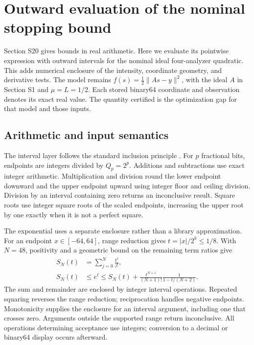 \section{Outward evaluation of the nominal stopping bound}
\label{sec:svalidated}
Section S20 gives bounds in real arithmetic. Here we evaluate its pointwise expression with outward intervals for the nominal ideal four-analyzer quadratic. This adds numerical enclosure of the intensity, coordinate geometry, and derivative tests. The model remains $f(s)=\tfrac12\|As-y\|^2$, with the ideal $A$ in Section S1 and $\mu=L=1/2$. Each stored binary64 coordinate and observation denotes its exact real value. The quantity certified is the optimization gap for that model and those inputs.

\subsection{Arithmetic and input semantics}
The interval layer follows the standard inclusion principle \cite[Secs.~5.3--5.5]{rump}. For $p$ fractional bits, endpoints are integers divided by $Q_p=2^p$. Additions and subtractions use exact integer arithmetic. Multiplication and division round the lower endpoint downward and the upper endpoint upward using integer floor and ceiling division. Division by an interval containing zero returns an inconclusive result. Square roots use integer square roots of the scaled endpoints, increasing the upper root by one exactly when it is not a perfect square.

The exponential uses a separate enclosure rather than a library approximation. For an endpoint $x\in[-64,64]$, range reduction gives $t=|x|/2^k\le1/8$. With $N=48$, positivity and a geometric bound on the remaining term ratios give
\begin{equation}
 \begin{aligned}
 S_N(t)&=\sum_{j=0}^{N}\frac{t^j}{j!},\\
 S_N(t)&\le e^t\le S_N(t)+
 \frac{t^{N+1}}{(N+1)!}\frac{1}{1-t/(N+2)}.
 \end{aligned}
 \label{eq:intervalexp}
\end{equation}
The sum and remainder are enclosed by integer interval operations. Repeated squaring reverses the range reduction; reciprocation handles negative endpoints. Monotonicity supplies the enclosure for an interval argument, including one that crosses zero. Arguments outside the supported range return inconclusive. All operations determining acceptance use integers; conversion to a decimal or binary64 display occurs afterward.

